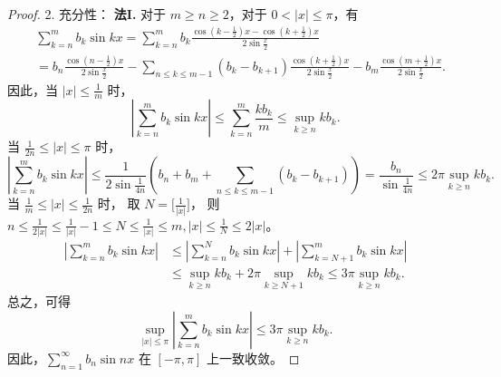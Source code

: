 \begin{quizb}
\begin{enumerate}
\begin{proof}
2. 充分性：
\textbf{法I.} 对于 $m \geqslant n \geqslant 2$，对于 $0<|x| \leqslant \pi$，有
\begin{align*}
& \sum_{k=n}^m b_k \sin k x=\sum_{k=n}^m b_k \frac{\cos \left(k-\frac{1}{2}\right) x-\cos \left(k+\frac{1}{2}\right) x}{2 \sin \frac{x}{2}} \\
& = b_n \frac{\cos \left(n-\frac{1}{2}\right) x}{2 \sin \frac{x}{2}}
-\sum_{n \leqslant k \leqslant m-1}\left(b_k-b_{k+1}\right) \frac{\cos \left(k+\frac{1}{2}\right) x}{2 \sin \frac{x}{2}}
-b_m \frac{\cos \left(m+\frac{1}{2}\right) x}{2 \sin \frac{x}{2}}.
\end{align*}
因此，当 $|x| \leqslant \frac{1}{m}$ 时，
\[\left|\sum_{k=n}^m b_k \sin k x\right| 
\leqslant \sum_{k=n}^m \frac{k b_k}{m} \leqslant \sup_{k \geqslant n} k b_k.\]
当 $\frac{1}{2n} \leqslant |x| \leqslant \pi$ 时，
\[\left|\sum_{k=n}^m b_k \sin k x\right| 
\leqslant \frac{1}{2 \sin \frac{1}{4n}}\left(b_n+b_m+\sum_{n \leqslant k \leqslant m-1}(b_k-b_{k+1})\right)
=\frac{b_n}{\sin \frac{1}{4n}} 
\leqslant 2 \pi \sup_{k \geqslant n} k b_k.\]
当 $\frac{1}{m} \leqslant |x| \leqslant \frac{1}{2 n}$ 时，
取 $N=\big[\frac{1}{|x|}\big]$，
则 $n \leqslant \frac{1}{2|x|} \leqslant \frac{1}{|x|}-1 
\leqslant N \leqslant \frac{1}{|x|} 
\leqslant m,|x| \leqslant \frac{1}{N} \leqslant 2|x|$。
\begin{align*}
\left|\sum_{k=n}^m b_k \sin k x\right| & \leqslant\left|\sum_{k=n}^N b_k \sin k x\right|+\left|\sum_{k=N+1}^m b_k \sin k x\right| \\
& \leqslant \sup_{k \geqslant n} k b_k+2 \pi \sup_{k \geqslant N+1} k b_k \leqslant 3 \pi \sup_{k \geqslant n} k b_k.
\end{align*}
总之，可得
\[\sup_{|x| \leqslant \pi}\left|\sum_{k=n}^m b_k \sin k x\right| 
\leqslant 3 \pi \sup _{k \geqslant n} k b_k.\]
因此，\(\sum_{n=1}^{\infty} b_n \sin n x\) 在 $[-\pi, \pi]$ 上一致收敛。


\end{proof}
\end{enumerate}
\end{quizb}
